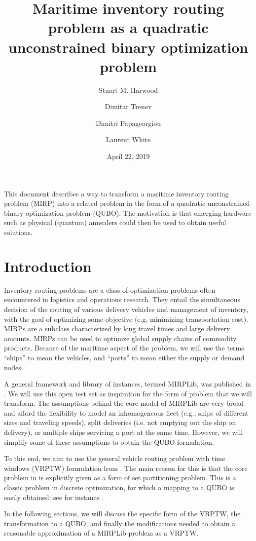 \documentclass[11pt]{article}
\title{Maritime inventory routing problem as a quadratic unconstrained binary optimization problem}
\author{Stuart M. Harwood \and Dimitar Trenev \and Dimitri Papageorgiou \and Laurent White}
\date{April 22, 2019}
\theoremstyle{definition}
\newcommand{\0}{\mathbf{0}}
\begin{document}
\maketitle

This document describes a way to transform a maritime inventory routing problem (MIRP) into a related problem in the form of a quadratic unconstrained binary optimization problem (QUBO).
The motivation is that emerging hardware such as physical (quantum) annealers could then be used to obtain useful solutions.

\section{Introduction}
Inventory routing problems are a class of optimization problems often encountered in logistics and operations research.
They entail the simultaneous decision of the routing of various delivery vehicles and management of inventory, with the goal of optimizing some objective (e.g. minimizing transportation cost).
MIRPs are a subclass characterized by long travel times and large delivery amounts.
MIRPs can be used to optimize global supply chains of commodity products.
Because of the maritime aspect of the problem, we will use the terms ``ships'' to mean the vehicles, and ``ports'' to mean either the supply or demand nodes.

A general framework and library of instances, termed MIRPLib, was published in \cite{mirplib}.
We will use this open test set as inspiration for the form of problem that we will transform.
The assumptions behind the core model of MIRPLib are very broad and afford the flexibility to model an inhomogeneous fleet (e.g., ships of different sizes and traveling speeds), split deliveries (i.e. not emptying out the ship on delivery), or multiple ships servicing a port at the same time.
However, we will simplify some of these assumptions to obtain the QUBO formulation.

To this end, we aim to use the general vehicle routing problem with time windows (VRPTW) formulation from \cite{desrochersEA92}.
The main reason for this is that the core problem in \cite{desrochersEA92} is explicitly given as a form of set partitioning problem. 
This is a classic problem in discrete optimization, for which a mapping to a QUBO is easily obtained;
see for instance \cite[\S4.1]{lucas14}. %

In the following sections, we will discuss the specific form of the VRPTW, the transformation to a QUBO,  and finally the modifications needed to obtain a reasonable approximation of a MIRPLib problem as a VRPTW.
\end{document}
